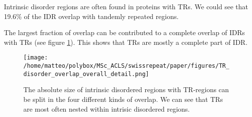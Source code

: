 \documentclass[a4,center,fleqn]{NAR}
\begin{document}
Intrinsic disorder regions are often found in proteins with TRs. We could see that 19.6\% of the IDR overlap with tandemly repeated regions. 


The largest fraction of overlap can be contributed to a complete overlap of IDRs with TRs (see figure \ref{TR_disorder_overlap_overall_detail}). This shows that TRs are mostly a complete part of IDR. 

\begin{figure}[t]
\begin{center}
\texttt{[image: /home/matteo/polybox/MSc\_ACLS/swissrepeat/paper/figures/TR\_disorder\_overlap\_overall\_detail.png]}
\end{center}
\caption{The absolute size of intrinsic disordered regions with TR-regions can be split in the four different kinds of overlap. We can see that TRs are most often nested within intrisic disordered regions.  }
\label{TR_disorder_overlap_overall_detail}
\end{figure}
\end{document}
